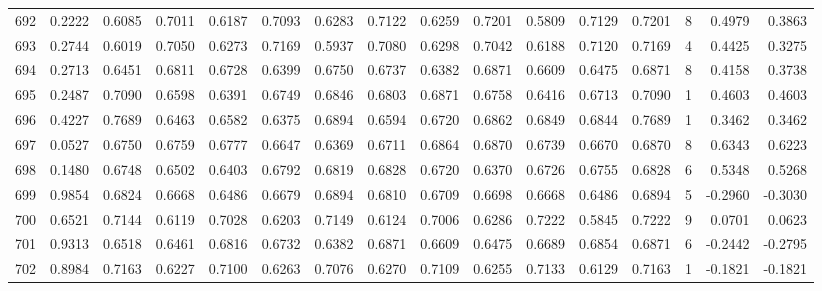 \begin{tabular}{lrrrrrrrrrrrrrrr}
692 &      0.2222 &  0.6085 &  0.7011 &  0.6187 &  0.7093 &  0.6283 &  0.7122 &  0.6259 &  0.7201 &  0.5809 &   0.7129 &     0.7201 &      8 &                    0.4979 &                     0.3863 \\
693 &      0.2744 &  0.6019 &  0.7050 &  0.6273 &  0.7169 &  0.5937 &  0.7080 &  0.6298 &  0.7042 &  0.6188 &   0.7120 &     0.7169 &      4 &                    0.4425 &                     0.3275 \\
694 &      0.2713 &  0.6451 &  0.6811 &  0.6728 &  0.6399 &  0.6750 &  0.6737 &  0.6382 &  0.6871 &  0.6609 &   0.6475 &     0.6871 &      8 &                    0.4158 &                     0.3738 \\
695 &      0.2487 &  0.7090 &  0.6598 &  0.6391 &  0.6749 &  0.6846 &  0.6803 &  0.6871 &  0.6758 &  0.6416 &   0.6713 &     0.7090 &      1 &                    0.4603 &                     0.4603 \\
696 &      0.4227 &  0.7689 &  0.6463 &  0.6582 &  0.6375 &  0.6894 &  0.6594 &  0.6720 &  0.6862 &  0.6849 &   0.6844 &     0.7689 &      1 &                    0.3462 &                     0.3462 \\
697 &      0.0527 &  0.6750 &  0.6759 &  0.6777 &  0.6647 &  0.6369 &  0.6711 &  0.6864 &  0.6870 &  0.6739 &   0.6670 &     0.6870 &      8 &                    0.6343 &                     0.6223 \\
698 &      0.1480 &  0.6748 &  0.6502 &  0.6403 &  0.6792 &  0.6819 &  0.6828 &  0.6720 &  0.6370 &  0.6726 &   0.6755 &     0.6828 &      6 &                    0.5348 &                     0.5268 \\
699 &      0.9854 &  0.6824 &  0.6668 &  0.6486 &  0.6679 &  0.6894 &  0.6810 &  0.6709 &  0.6698 &  0.6668 &   0.6486 &     0.6894 &      5 &                   -0.2960 &                    -0.3030 \\
700 &      0.6521 &  0.7144 &  0.6119 &  0.7028 &  0.6203 &  0.7149 &  0.6124 &  0.7006 &  0.6286 &  0.7222 &   0.5845 &     0.7222 &      9 &                    0.0701 &                     0.0623 \\
701 &      0.9313 &  0.6518 &  0.6461 &  0.6816 &  0.6732 &  0.6382 &  0.6871 &  0.6609 &  0.6475 &  0.6689 &   0.6854 &     0.6871 &      6 &                   -0.2442 &                    -0.2795 \\
702 &      0.8984 &  0.7163 &  0.6227 &  0.7100 &  0.6263 &  0.7076 &  0.6270 &  0.7109 &  0.6255 &  0.7133 &   0.6129 &     0.7163 &      1 &                   -0.1821 &                    -0.1821 \\

\end{tabular}
